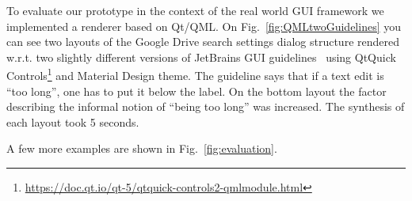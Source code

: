 


To evaluate our prototype in the context of the real world GUI framework we implemented a renderer based on Qt/QML. On Fig.~\ref{fig:QMLtwoGuidelines} you can see two layouts of the
Google Drive search settings dialog structure rendered  w.r.t. two slightly different versions of JetBrains GUI guidelines~\cite{JBG} using QtQuick Controls\footnote{\url{https://doc.qt.io/qt-5/qtquick-controls2-qmlmodule.html}} and Material Design theme. The guideline says that if a text edit is ``too long'', one has to put it below the label.
On the bottom layout the
factor describing the informal notion of ``being too long'' was increased. The synthesis of each layout took 5 seconds.

A few more examples are shown in Fig.~\ref{fig:evaluation}.




